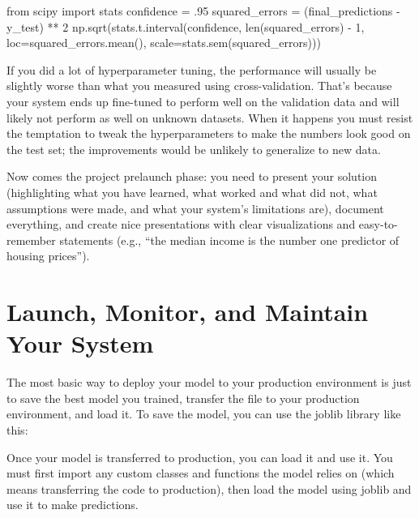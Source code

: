 \begin{pyc}
from scipy import stats
confidence = .95
squared_errors = (final_predictions - y_test) ** 2
np.sqrt(stats.t.interval(confidence, len(squared_errors) - 1,
                         loc=squared_errors.mean(),
                         scale=stats.sem(squared_errors)))
\end{pyc}

If you did a lot of hyperparameter tuning, the performance will usually be slightly worse than what you measured using cross-validation. That's because your system ends up fine-tuned to perform well on the validation data and will likely not perform as well on unknown datasets. When it happens you must resist the temptation to tweak the hyperparameters to make the numbers look good on the test
set; the improvements would be unlikely to generalize to new data.

Now comes the project prelaunch phase: you need to present your solution (highlighting what you have learned, what worked and what did not, what assumptions were made, and what your system's limitations are), document everything, and create nice presentations with clear visualizations and easy-to-remember statements (e.g., ``the median income is the number one predictor of housing prices”).
\section{Launch, Monitor, and Maintain Your System}
The most basic way to deploy your model to your production environment is just to save the best model you trained, transfer the file to your production environment, and load it. To save the model, you can use the joblib library like this:


Once your model is transferred to production, you can load it and use it. You must first import any custom classes and functions the model relies on (which means transferring the code to production), then load the model using joblib and use it to make predictions.


